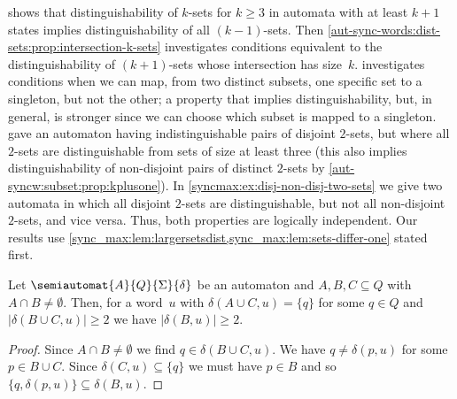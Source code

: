 

 shows that distinguishability of $k$-sets for $k \ge 3$
in automata with at least $k+1$ states implies distinguishability of all $(k-1)$-sets.
Then \cref{aut-sync-words:dist-sets:prop:intersection-k-sets} 
investigates conditions equivalent to the distinguishability
of $(k+1)$-sets whose intersection has size~$k$.
 investigates
conditions when we can map, from two distinct subsets, one specific
set to a singleton, but not the other;
a property that implies distinguishability, but, in general, is stronger
since we can choose which subset is mapped to a singleton.
gave an automaton having indistinguishable pairs
of disjoint $2$-sets, but where all $2$-sets
are distinguishable from sets of size at least three (this also implies distinguishability
of non-disjoint pairs of distinct $2$-sets by \cref{aut-syncw:subset:prop:kplusone}).
In \cref{syncmax:ex:disj-non-disj-two-sets} we give
two automata in which all disjoint $2$-sets are distinguishable,
but not all non-disjoint $2$-sets, and vice versa.
Thus, both properties are logically independent.
Our results use \cref{sync_max:lem:largersetsdist,sync_max:lem:sets-differ-one} stated first.

\begin{lemma} \label{sync_max:lem:largersetsdist}
	Let $\semiautomat{A}{Q}{\Sigma}{\delta}$
	be an automaton and $A, B, C \subseteq Q$ with $A \cap B \ne \emptyset$.
	Then, for a word~$u$
	with $\delta(A \cup C, u) = \{q\}$ for some $q \in Q$
	and $|\delta(B \cup C, u)| \ge 2$
	we have $|\delta(B, u)| \ge 2$.
\end{lemma}
\begin{proof}
	Since $A \cap B \ne \emptyset$
	we find $q \in \delta(B \cup C, u)$.
	We have $q \ne \delta(p, u)$ for some $p \in B \cup C$.
	Since $\delta(C, u) \subseteq \{q\}$
	we must have $p \in B$
	and so $\{q, \delta(p, u)\} \subseteq \delta(B, u)$.
\end{proof}


